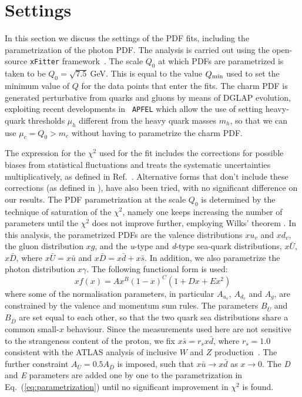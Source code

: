 \section{Settings}
\label{sec:fitsettings}

In this section we discuss the settings of the PDF fits, including the
parametrization of the photon PDF.
%
The analysis is carried out using the open-source {\tt xFitter}
framework~\cite{Alekhin:2014irh}.
%
The scale $Q_0$ at which PDFs are parametrized is taken to be
$Q_0 = \sqrt{7.5}~$GeV.
%
This is equal to the value $Q_{\rm min}$ used to set the minimum value
of $Q$ for the data points that enter the fits.
%
The charm PDF is generated perturbative from quarks and gluons by
means of DGLAP evolution, exploiting recent developments in {\tt
  APFEL} which allow the use of setting heavy-quark thresholds $\mu_h$
different from the heavy quark masses $m_h$, so that we can use
$\mu_c=Q_0 > m_c$ without having to parametrize the charm PDF.

The expression for the $\chi^2$ used for the fit 
includes the corrections for possible 
biases from statistical fluctuations and treats the systematic uncertainties
multiplicatively, as defined in
Ref.~\cite{Aaron:2012qi}. 
%
Alternative forms that don't include these corrections (as defined in \cite{Aaron:2009aa,Abramowicz:2015mha}),
have also been tried, with no significant difference
on our results.
% 
The PDF parametrization at the scale $Q_0$ is determined by the
technique of saturation of the $\chi^{2}$, namely one keeps increasing
the number of parameters until the $\chi^{2}$ does not improve
further, employing Wilks' theorem \cite{Wilks:1938dza}.
%
In this analysis, the parametrized PDFs are the valence distributions
$xu_{v}$ and $xd_{v}$, the gluon distribution $xg$, and the
\textit{u}-type and \textit{d}-type sea-quark distributions,
$x\bar{U}$, $x\bar{D}$, where $x\bar{U} = x\bar{u}$ and
$x\bar{D} = x\bar{d} + x\bar{s}$.
%
In addition, we also parametrize the photon distribution $x\gamma$.
%
The following functional form is used:
\begin{equation}
  \label{eq:parametrization}
xf(x) = Ax^{B}(1-x)^{C}(1+Dx+Ex^{2})
\end{equation}
where some of the normalisation parameters, in particular $A_{u_{v}}$,
$A_{d_{v}}$ and $A_{g}$, are constrained by the valence and momentum
sum rules.
%
The parameters $B_{\bar{U}}$ and $B_{\bar{D}}$ are set equal to each
other, so that the two quark sea distributions share a common
small-$x$ behaviour.
%
Since the measurements used here are not sensitive to the strangeness
content of the proton, we fix $x\bar{s} = r_sx\bar{d}$, where
$r_s=1.0$ consistent with the ATLAS analysis of inclusive $W$
and $Z$ production~\cite{Aad:2012sb,Aaboud:2016btc}.
%
The further constraint $A_{\bar{U}} = 0.5 A_{\bar{D}}$ is imposed,
such that $x\bar{u} \to x\bar{d}$ as $x \to 0$.  The \textit{D} and
\textit{E} parameters are added one by one to the parametrization in
Eq.~(\ref{eq:parametrization}) until no significant improvement in
$\chi^{2}$ is found.

